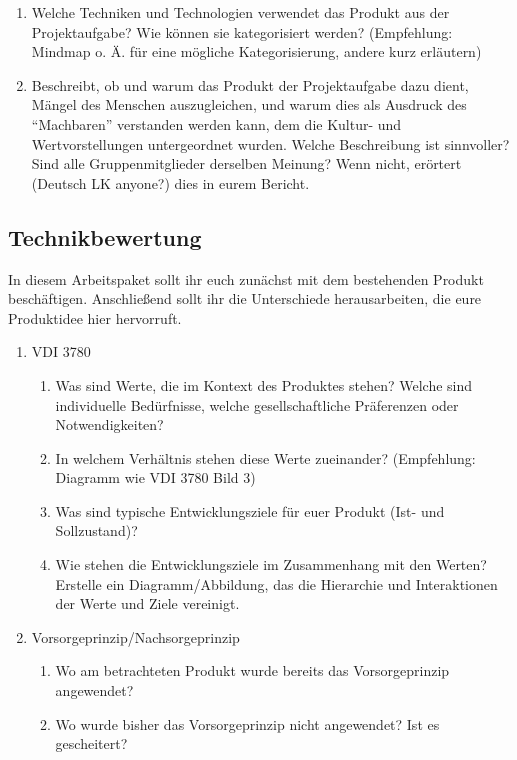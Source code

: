 \documentclass[headinclude=true]{scrartcl}
\begin{document}
\begin{enumerate}
	\item
	     Welche Techniken und Technologien verwendet das Produkt aus der Projektaufgabe? Wie können sie kategorisiert werden? (Empfehlung: Mindmap o. Ä. für eine mögliche Kategorisierung, andere kurz erläutern)
	\item
	      Beschreibt, ob und warum das Produkt der Projektaufgabe dazu dient, Mängel des Menschen auszugleichen, und warum dies als Ausdruck des “Machbaren” verstanden werden kann, dem die Kultur- und Wertvorstellungen untergeordnet wurden. Welche Beschreibung ist sinnvoller? Sind alle Gruppenmitglieder derselben Meinung? Wenn nicht, erörtert (Deutsch LK anyone?) dies in eurem Bericht.
\end{enumerate}

\subsection{Technikbewertung} \label{technikbewertung}
In diesem Arbeitspaket sollt ihr euch zunächst mit dem bestehenden Produkt beschäftigen. Anschließend sollt ihr die Unterschiede herausarbeiten, die eure Produktidee hier hervorruft.

\begin{enumerate}
	\item
	      VDI 3780

	      \begin{enumerate}
		      \item
		            Was sind Werte, die im Kontext des Produktes stehen? Welche sind
		            individuelle Bedürfnisse, welche gesellschaftliche Präferenzen oder
		            Notwendigkeiten?
		      \item
		            In welchem Verhältnis stehen diese Werte zueinander? (Empfehlung:
		            Diagramm wie VDI 3780 Bild 3)
		      \item
		            Was sind typische Entwicklungsziele für euer Produkt (Ist- und Sollzustand)? \label{entwicklungsziele}
		      \item
		            Wie stehen die Entwicklungsziele im Zusammenhang mit den Werten?
		            Erstelle ein Diagramm/Abbildung, das die Hierarchie und
		            Interaktionen der Werte und Ziele vereinigt.
	      \end{enumerate}
	\item
	      Vorsorgeprinzip/Nachsorgeprinzip 

	      \begin{enumerate}
		      \item
		            Wo am betrachteten Produkt wurde bereits das Vorsorgeprinzip
		            angewendet?
		      \item
		            Wo wurde bisher das Vorsorgeprinzip nicht angewendet? Ist es
		            gescheitert?
	      \end{enumerate}
\end{enumerate}
\end{document}

